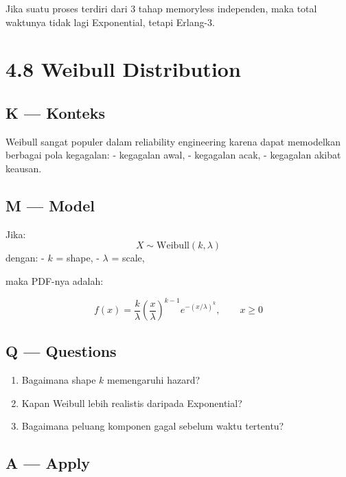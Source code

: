 \documentclass[
  letterpaper,
  DIV=11,
  numbers=noendperiod]{scrreprt}
\providecommand{\tightlist}{%
  \setlength{\itemsep}{0pt}\setlength{\parskip}{0pt}}
\begin{document}
Jika suatu proses terdiri dari 3 tahap memoryless independen, maka total
waktunya tidak lagi Exponential, tetapi Erlang-3.

\section{4.8 Weibull Distribution}\label{weibull-distribution}

\subsection{K --- Konteks}\label{k-konteks-25}

Weibull sangat populer dalam reliability engineering karena dapat
memodelkan berbagai pola kegagalan: - kegagalan awal, - kegagalan acak,
- kegagalan akibat keausan.

\subsection{M --- Model}\label{m-model-25}

Jika: \[
X \sim \text{Weibull}(k,\lambda)
\] dengan: - \(k\) = shape, - \(\lambda\) = scale,

maka PDF-nya adalah:

\[
f(x)=\frac{k}{\lambda}\left(\frac{x}{\lambda}\right)^{k-1}e^{-(x/\lambda)^k}, \qquad x \ge 0
\]

\subsection{Q --- Questions}\label{q-questions-25}

\begin{enumerate}
\def\labelenumi{\arabic{enumi}.}
\tightlist
\item
  Bagaimana shape \(k\) memengaruhi hazard?
\item
  Kapan Weibull lebih realistis daripada Exponential?
\item
  Bagaimana peluang komponen gagal sebelum waktu tertentu?
\end{enumerate}

\subsection{A --- Apply}\label{a-apply-25}
\end{document}

